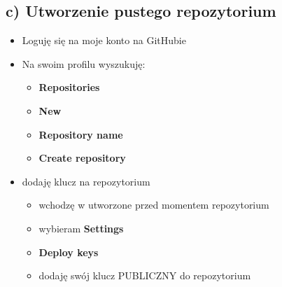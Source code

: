 \documentclass[a4paper, 11pt]{article}
\begin{document}
\subsection*{c) Utworzenie pustego repozytorium}
\begin{itemize}

\item Loguję się na moje konto na GitHubie
\item Na swoim profilu wyszukuję:
\begin{itemize}

\item {\bf Repositories}
\item {\bf New}
\item {\bf Repository name}
\item {\bf Create repository}

\end{itemize}

\item dodaję klucz na repozytorium
\begin{itemize}

\item wchodzę w utworzone przed momentem repozytorium 
\item wybieram {\bf Settings}
\item {\bf Deploy keys}
\item dodaję swój klucz PUBLICZNY do repozytorium

\end{itemize}
\end{itemize}
\end{document}
